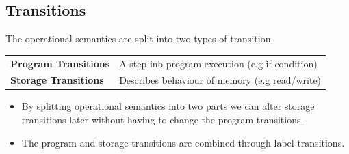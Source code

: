 \newcommand{\ctrans}[1]{\overset{#1}{\to_c}}
\newcommand{\ceval}[2]{\text{eval}(#1, #2)}
\subsection{Transitions}
The operational semantics are split into two types of transition.
\begin{center}
    \begin{tabular}{l p{}}
        \textbf{Program Transitions} & A step inb program execution (e.g if condition) \\
        \textbf{Storage Transitions} & Describes behaviour of memory (e.g read/write) \\
    \end{tabular}
\end{center}
\begin{itemize}
    \item By splitting operational semantics into two parts we can alter storage transitions later without having to change the program transitions.
    \item The program and storage transitions are combined through label transitions.
\end{itemize}


